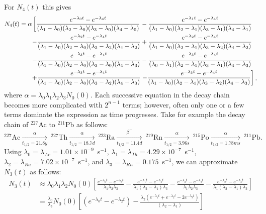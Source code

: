 \documentclass[11pt]{article}
\begin{document}
For $N_4(t)$ this gives
\begin{align}
\label{eq:N4}
N_4(t)=\alpha\left[\frac{e^{-\lambda_0t}-e^{-\lambda_4t}}{(\lambda_1-\lambda_0)(\lambda_2-\lambda_0)(\lambda_3-\lambda_0)(\lambda_4-\lambda_0)}\right.&-\frac{e^{-\lambda_1t}-e^{-\lambda_4t}}{(\lambda_1-\lambda_0)(\lambda_2-\lambda_1)(\lambda_3-\lambda_1)(\lambda_4-\lambda_1)}\notag\\-\frac{e^{-\lambda_2t}-e^{-\lambda_4t}}{(\lambda_1-\lambda_0)(\lambda_2-\lambda_0)(\lambda_3-\lambda_2)(\lambda_4-\lambda_2)}&+\frac{e^{-\lambda_2t}-e^{-\lambda_4t}}{(\lambda_1-\lambda_0)(\lambda_2-\lambda_1)(\lambda_3-\lambda_2)(\lambda_4-\lambda_2)}\notag\\-\frac{e^{-\lambda_3t}-e^{-\lambda_4t}}{(\lambda_1-\lambda_0)(\lambda_2-\lambda_0)(\lambda_3-\lambda_0)(\lambda_4-\lambda_3)}&-\frac{e^{-\lambda_3t}-e^{-\lambda_4t}}{(\lambda_0-\lambda_1)(\lambda_2-\lambda_1)(\lambda_3-\lambda_1)(\lambda_4-\lambda_3)}\notag\\+\frac{e^{-\lambda_3t}-e^{-\lambda_4t}}{(\lambda_1-\lambda_0)(\lambda_2-\lambda_0)(\lambda_3-\lambda_2)(\lambda_4-\lambda_3)}&\left.-\frac{e^{-\lambda_3t}-e^{-\lambda_4t}}{(\lambda_1-\lambda_0)(\lambda_2-\lambda_1)(\lambda_3-\lambda_2)(\lambda_4-\lambda_3)}\right],
\end{align}
where $\alpha=\lambda_0\lambda_1\lambda_2\lambda_3N_0(0)$.
Each successive equation in the decay chain becomes more complicated with $2^{n-1}$ terms; however, often only one or a few terms dominate the expression as time progresses. Take for example the decay chain of $^{227}$Ac to $^{211}$Pb as follows:
\begin{equation}
\label{eq:decay_chain_diagram}
^{227}\text{Ac}\xrightarrow[t_{1/2}=21.8 y]{\alpha}~^{227}\text{Th}\xrightarrow[t_{1/2}=18.7 d]{\alpha}~^{223}\text{Ra}\xrightarrow[t_{1/2}=11.4 d]{\beta^-}~^{219}\text{Rn}\xrightarrow[t_{1/2}=3.96 s]{\alpha}~^{215}\text{Po}\xrightarrow[t_{1/2}=1.78ms]{\alpha}~^{211}\text{Pb}.
\end{equation}
Using $\lambda_0=\lambda_{Ac}=1.01\times10^{-9}$~s$^{-1}$, $\lambda_1=\lambda_{Th}=4.29\times10^{-7}$~s$^{-1}$, $\lambda_2=\lambda_{Ra}=7.02\times10^{-7}$~s$^{-1}$, and $\lambda_3=\lambda_{Rn}=0.175$~s$^{-1}$, we can approximate $N_3(t)$ as follows:
\begin{align}
N_3(t)&\approx\lambda_0\lambda_1\lambda_2N_0(0)\left[\frac{e^{-\lambda_0t}-e^{-\lambda_3t}}{\lambda_1\lambda_2\lambda_3}-\frac{e^{-\lambda_1t}-e^{-\lambda_3t}}{\lambda_1(\lambda_2-\lambda_1)\lambda_3}-\frac{e^{-\lambda_2t}-e^{-\lambda_3t}}{\lambda_1\lambda_2\lambda_3}-\frac{e^{-\lambda_2t}-e^{-\lambda_3t}}{\lambda_1(\lambda_2-\lambda_1)\lambda_3}\right]\\&=\frac{\lambda_0}{\lambda_3}N_0(0)\left[\left(e^{-\lambda_0t}-e^{-\lambda_2t}\right)-\frac{\lambda_2\left(e^{-\lambda_1t}+e^{-\lambda_2t}-2e^{-\lambda_3t}\right)}{(\lambda_2-\lambda_1)}\right]
\end{align}
\end{document}
